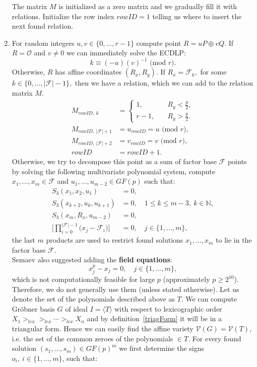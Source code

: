 \documentclass[thesis=M,english]{FITthesis}[2012/10/20]
\theoremstyle{remark}
\theoremstyle{definition}
\begin{document}
\begin{enumerate}
The matrix $M$ is initialized as a zero matrix and we gradually fill it with relations. Initialize the row index $rowID = 1$ telling us where to insert the next found relation.
\item For random integers $u,v \in \{0, \ldots, r-1\}$ compute point ${R = uP \oplus vQ.}$ If $R = \mathcal{O}$ and $v \neq 0$ we can immediately solve the ECDLP:
$$k \equiv  (-u)(v)^{-1} \text{ (mod $r$)}.$$ Otherwise, $R$ has affine coordinates $(R_x, R_y)$. If $R_x = \mathcal{F}_k,$ for some $k \in \{0,\ldots,|\mathcal{F}| - 1\},$ then we have a relation, which we can add to the relation matrix $M$.
\begin{align*}
M_{rowID,\ k} &=\begin{cases} 1, \quad &R_y < \frac{p}{2}, \\
r-1, \quad &R_y > \frac{p}{2}.
\end{cases}\\
M_{rowID,\ |\mathcal{F}| + 1} &= u_{rowID} = u \text{ (mod $r$)}, \\
M_{rowID,\ |\mathcal{F}| + 2} &= v_{rowID} = v \text{ (mod $r$)}, \\
rowID &= rowID + 1.
\end{align*}
Otherwise, we try to decompose this point as a sum of factor base $\mathcal{F}$ points by solving the following multivariate polynomial system, compute $x_1,\ldots,x_m \in \mathcal{F}$ and $u_1,\ldots,u_{m-2} \in GF(p)$ such that:
\begin{align*}
S_3(x_1,x_2,u_1) &= 0, \\
S_3(x_{k+2},u_k,u_{k+1}) &= 0,\quad 1 \leq k \leq m - 3,\ k \in \mathbb{N}, \\
S_3(x_m,R_x,u_{m-2}) &= 0, \\
\Bigg[\prod_{i=0}^{|\mathcal{F}| -1}\Big(x_j - \mathcal{F}_i\Big)\Bigg] &= 0, \quad  j \in \{1, \ldots, m\},
\end{align*}
the last $m$ products are used to restrict found solutions $x_1,\ldots,x_m$ to lie in the factor base $\mathcal{F}$. \\ 
\noindent Semaev also suggested adding the \textbf{field equations}:
$$
x_j^p - x_j = 0, \quad j \in \{1, \ldots, m\},
$$
which is not computationally feasible for large $p$ (approximately $p \geq 2^{10}$). Therefore, we do not generally use them (unless stated otherwise). Let us denote the set of the polynomials described above as $T$. We can compute Gröbner basis $G$ of ideal $I = \langle T \rangle$  with respect to lexicographic order $X_1 >_{lex} >_{lex} \cdots >_{lex} X_n$ and by definition~\ref{triagForm} it will be in a triangular form. Hence we can easily find the affine variety $\mathcal{V}(G) = \mathcal{V}(T)$, i.e. the set of the common zeroes of the polynomials $\in T$. For every found solution ${(s_1, \ldots, s_m) \in GF(p)^m}$ we first determine the signs $o_i,\ i \in \{1,\ldots,m\}$, such that:

\end{enumerate}
\end{document}

